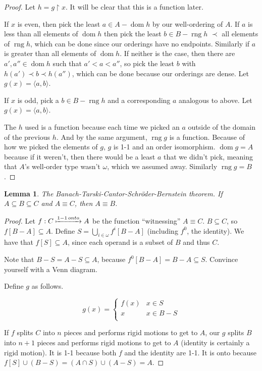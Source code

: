 \documentclass[12pt]{article}
\DeclareMathOperator{\rng}{rng}
\DeclareMathOperator{\dom}{dom}
\newtheorem*{lemma*}{Lemma}
\begin{document}
\begin{description}
\begin{proof}
  Let $h = g \upharpoonright x$.  It will be clear that this is a
  function later.

  If $x$ is even, then pick the least $a \in A - \dom{h}$ by our
  well-ordering of $A$.   If $a$ is less than all elements of $\dom{h}$
  then pick the least $b \in B - \rng{h}$ $\prec$ all elements of
  $\rng{h}$, which can be done since our orderings have no endpoints.
  Similarly if $a$ is greater than all elements of $\dom{h}$.  If
  neither is the case, then there are $a', a'' \in \dom{h}$ such that
  $a' < a < a''$, so pick the least $b$ with $h(a') \prec b \prec
  h(a'')$, which can be done because our orderings are dense.  Let $g(x)
  = \langle a,b \rangle$.

  If $x$ is odd, pick a $b \in B - \rng{h}$ and a corresponding $a$
  analogous to above.  Let $g(x) = \langle a,b \rangle$.

  The $h$ used is a function because each time we picked an $a$ outside
  of the domain of the previous $h$.  And by the same argument,
  $\rng{g}$ is a function.  Because of how we picked the elements of
  $g$, $g$ is 1-1 and an order isomorphism. $\dom{g} = A$ because if it
  weren't, then there would be a least $a$ that we didn't pick, meaning
  that $A$'s well-order type wasn't $\omega$, which we assumed away.
  Similarly $\rng{g} = B$.  
  \end{proof}
\end{description}

\begin{lemma*}
The Banach-Tarski-Cantor-Schr\"oder-Bernstein theorem.  If $A
\subseteq B \subseteq C$ and $A \equiv C$, then $A \equiv B$.
\end{lemma*}
  \begin{proof}
  Let $f: C \xmapsto{1-1\,onto} A$ be the function ``witnessing'' $A
  \equiv C$.  $B \subseteq C$, so $f[B-A] \subseteq A$.  Define $S =
  \bigcup\limits_{i \in \omega}{f^i[B-A]}$ (including $f^0$, the
  identity).  We have that $f[S] \subseteq A$, since each operand is a
  subset of $B$ and thus $C$.

  Note that $B-S = A-S \subseteq A$, because $f^0[B-A] = B-A \subseteq S$.
  Convince yourself with a Venn diagram.  

  Define $g$ as follows.

  \begin{equation*}
  g(x) = \begin{cases}
    f(x) & x \in S \\
	x    & x \in B-S \\
  \end{cases}
  \end{equation*}

  If $f$ splits $C$ into $n$ pieces and performs rigid motions to get to
  $A$, our $g$ splits $B$ into $n+1$ pieces and performs rigid motions
  to get to $A$ (identity is certainly a rigid motion).  It is 1-1
  because both $f$ and the identity are 1-1.  It is onto because $f[S]
  \cup (B-S) = (A \cap S) \cup (A - S) = A$.
  \end{proof}
\end{document}
